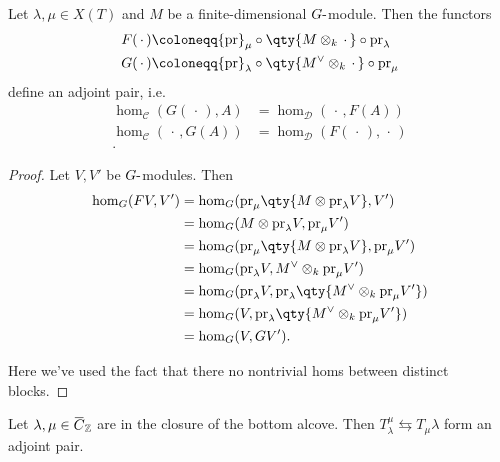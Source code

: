 \begin{lemma}[?]

Let \(\lambda,\mu\in X(T)\) and \(M\) be a finite-dimensional
\(G{\hbox{-}}\)module. Then the functors
\begin{align*}  
F({\,\cdot\,}) &\coloneqq{\operatorname{pr}}_\mu \circ \qty{M\otimes_k {\,\cdot\,}} \circ {\operatorname{pr}}_\lambda \\
G({\,\cdot\,}) &\coloneqq{\operatorname{pr}}_\lambda \circ \qty{M^\vee\otimes_k {\,\cdot\,}} \circ {\operatorname{pr}}_\mu \\
\end{align*}
define an adjoint pair, i.e.
\begin{align*}  
\hom_\mathcal{C}(G({\,\cdot\,}), A) &= \hom_\mathcal{D}({\,\cdot\,}, F(A)) \\
\hom_\mathcal{C}({\,\cdot\,}, G(A)) &= \hom_\mathcal{D}( F({\,\cdot\,}), {\,\cdot\,}) \\
.\end{align*}

\end{lemma}

\begin{proof}

Let \(V, V'\) be \(G{\hbox{-}}\)modules. Then
\begin{align*}  
\hom_G(FV, V') 
&= \hom_G( {\operatorname{pr}}_\mu\qty{ M\otimes{\operatorname{pr}}_\lambda V  }, V') \\
&= \hom_G(  M\otimes{\operatorname{pr}}_\lambda V  , {\operatorname{pr}}_\mu V') \\
&= \hom_G(  {\operatorname{pr}}_\mu \qty{ M\otimes{\operatorname{pr}}_\lambda V }  , {\operatorname{pr}}_\mu V') \\
&= \hom_G(  {\operatorname{pr}}_\lambda V  , M^\vee\otimes_k {\operatorname{pr}}_\mu V') \\
&= \hom_G(  {\operatorname{pr}}_\lambda V  , {\operatorname{pr}}_\lambda\qty{ M^\vee\otimes_k {\operatorname{pr}}_\mu V'} ) \\
&= \hom_G(  V  , {\operatorname{pr}}_\lambda\qty{ M^\vee\otimes_k {\operatorname{pr}}_\mu V'} ) \\
&= \hom_G(V, GV')
.\end{align*}

Here we've used the fact that there no nontrivial homs between distinct
blocks.

\end{proof}

\begin{theorem}[?]

Let
\(\lambda, \mu \in \mkern 1.5mu\overline{\mkern-1.5muC\mkern-1.5mu}\mkern 1.5mu_{\mathbb{Z}}\)
are in the closure of the bottom alcove. Then
\(T_\lambda^\mu \leftrightarrows T_\mu \lambda\) form an adjoint pair.

\end{theorem}

